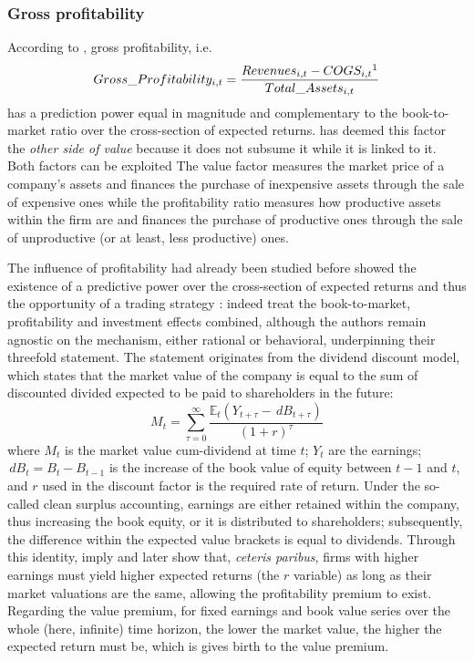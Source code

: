 \subsubsection{Gross profitability}
\label{subsubsec:profitability}
According to \cite{Novy-Marx2013}, gross profitability, i.e.
\begin{equation}
  Gross\_Profitability_{i, t} = \frac{Revenues_{i, t} - COGS_{i, t}\footnotemark}{Total\_Assets_{i, t}}
\end{equation}
has a prediction power equal in magnitude and complementary to the book-to-market ratio over the cross-section of expected returns. \cite{Novy-Marx2013} has deemed this factor the \emph{other side of value} because it does not subsume it while it is linked to it. Both factors can be exploited The value factor measures the market price of a company's assets and finances the purchase of inexpensive assets through the sale of expensive ones while the profitability ratio measures how productive assets within the firm are and finances the purchase of productive ones through the sale of unproductive (or at least, less productive) ones.

The influence of profitability had already been studied before \cite{Novy-Marx2013} showed the existence of a predictive power over the cross-section of expected returns and thus the opportunity of a trading strategy : indeed \cite{Fama2006} treat the book-to-market, profitability and investment effects combined, although the authors remain agnostic on the mechanism, either rational or behavioral, underpinning their threefold statement. The statement originates from the dividend discount model, which states that the market value of the company is equal to the sum of discounted divided expected to be paid to shareholders in the future:
\begin{equation}
  M_{t} = \sum_{\tau = 0}^{\infty}\frac{\mathbb{E}_{t}(Y_{t + \tau} - \,dB_{t + \tau})}{(1 + r)^{\tau}}
\end{equation}
where $M_{t}$ is the market value cum-dividend at time $t$; $Y_{t}$ are the earnings;$\,dB_{t} = B_{t} - B_{t - 1}$ is the increase of the book value of equity between $t - 1$ and $t$, and $r$ used in the discount factor is the required rate of return. Under the so-called clean surplus accounting, earnings are either retained within the company, thus increasing the book equity, or it is distributed to shareholders; subsequently, the difference within the expected value brackets is equal to dividends. Through this identity, \cite{Fama2006} imply and later show that, \emph{ceteris paribus}, firms with higher earnings must yield higher expected returns (the $r$ variable) as long as their market valuations are the same, allowing the profitability premium to exist. Regarding the value premium, for fixed earnings and book value series over the whole (here, infinite) time horizon, the lower the market value, the higher the expected return must be, which is gives birth to the value premium.


